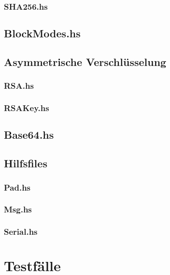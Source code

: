 \documentclass[11pt,a4paper,parskip=half]{scrartcl}
\begin{document}
\subsubsection{SHA256.hs}

\subsection{BlockModes.hs}

\subsection{Asymmetrische Verschlüsselung}
\subsubsection{RSA.hs}

\subsubsection{RSAKey.hs}

\subsection{Base64.hs}

\subsection{Hilfsfiles}
\subsubsection{Pad.hs}

\subsubsection{Msg.hs}

\subsubsection{Serial.hs}




\section{Testfälle}

\end{document}
